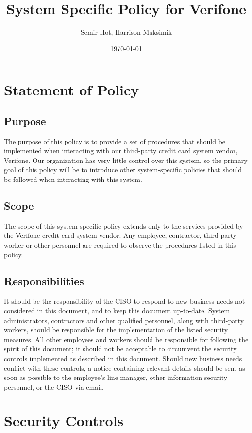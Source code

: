 \documentclass[11pt]{article}
\author{Semir Hot, Harrison Maksimik}
\date{\today}
\title{System Specific Policy for Verifone}
\begin{document}
\maketitle
\tableofcontents

\section{Statement of Policy}
\label{sec:org77cdbdd}
\subsection{Purpose}
\label{sec:orgcb62300}
The purpose of this policy is to provide a set of procedures that should be implemented when interacting with our third-party credit card system vendor, Verifone. Our organization has very little control over this system, so the primary goal of this policy will be to introduce other system-specific policies that should be followed when interacting with this system.

\subsection{Scope}
\label{sec:org16ce4c1}
The scope of this system-specific policy extends only to the services provided by the Verifone credit card system vendor. Any employee, contractor, third party worker or other personnel are required to observe the procedures listed in this policy.

\subsection{Responsibilities}
\label{sec:org2271932}
It should be the responsibility of the CISO to respond to new business needs not considered in this document, and to keep this document up-to-date. System administrators, contractors and other qualified personnel, along with third-party workers, should be responsible for the implementation of the listed security measures. All other employees and workers should be responsible for following the spirit of this document; it should not be acceptable to circumvent the security controls implemented as described in this document. Should new business needs conflict with these controls, a notice containing relevant details should be sent as soon as possible to the employee's line manager, other information security personnel, or the CISO via email.

\section{Security Controls}
\label{sec:orgd20561e}
\end{document}
